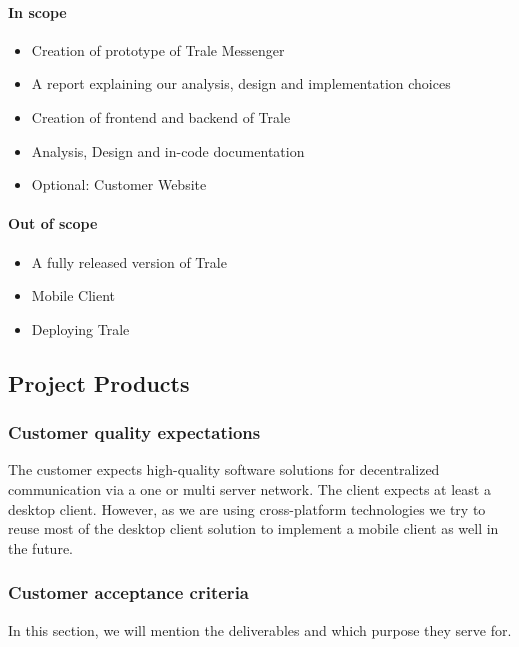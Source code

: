 \paragraph{In scope}
\begin{itemize}
    \item Creation of prototype of Trale Messenger
    \item A report explaining our analysis, design and implementation choices
    \item Creation of frontend and backend of Trale
    \item Analysis, Design and in-code documentation
    \item Optional: Customer Website
\end{itemize}

\paragraph{Out of scope}
\begin{itemize}
    \item A fully released version of Trale
    \item Mobile Client
    \item Deploying Trale
\end{itemize}

\subsection{Project Products}\label{subsec:project-products}

\subsubsection{Customer quality expectations}

The customer expects high-quality software solutions for decentralized communication via a one or multi server network.
The client expects at least a desktop client.
However, as we are using cross-platform technologies we try to reuse most of the desktop client solution to implement
a mobile client as well in the future.

\subsubsection{Customer acceptance criteria}

In this section, we will mention the deliverables and which purpose they serve for.

